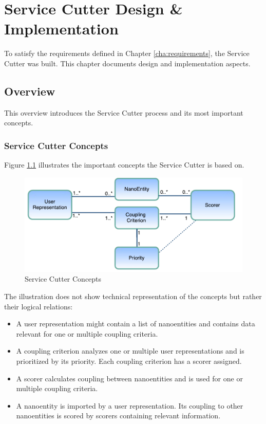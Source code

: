 
\chapter{Service Cutter Design \& Implementation}
\label{cha:implementation}

To satisfy the requirements defined in Chapter \ref{cha:requirements}, the Service Cutter was built. This chapter documents design and implementation aspects.

\section{Overview}

This overview introduces the Service Cutter process and its most important concepts.

\subsection{Service Cutter Concepts}

Figure \ref{fig:concepts} illustrates the important concepts the Service Cutter is based on.

\begin{figure}[H]
	\begin{center}
		\includegraphics[scale=0.8]{diagrams/concepts.pdf}
		\caption{Service Cutter Concepts}
		\label{fig:concepts}
	\end{center}
\end{figure}

The illustration does not show technical representation of the concepts but rather their logical relations:

\begin{itemize}
	\item A user representation might contain a list of nanoentities and contains data relevant for one or multiple coupling criteria.
	\item A coupling criterion analyzes one or multiple user representations and is prioritized by its priority. Each coupling criterion has a scorer assigned. 
	\item A scorer calculates coupling between nanoentities and is used for one or multiple coupling criteria.
	\item A nanoentity is imported by a user representation. Its coupling to other nanoentities is scored by scorers containing relevant information.
\end{itemize}


